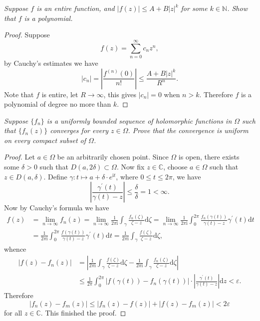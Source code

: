 \begin{problem}\em
Suppose $f$ is an entire function, and $|f(z)|\le A+B|z|^k$ for some $k\in\mathbb{N}$. Show that $f$ is a polynomial.
\end{problem}
\begin{proof}
Suppose 
$$f(z)=\sum_{n=0}^\infty c_nz^n,$$
by Cauchy's estimates we have 
$$
\left| c_n \right|=\left| \frac{f^{\left( n \right)}\left( 0 \right)}{n!} \right|\le \frac{A+B\left| z \right|^k}{R^n}.
$$
Note that $f$ is entire, let $R\to\infty$, this gives $|c_n|=0$ when $n>k$. Therefore $f$ is a polynomial of degree no more than $k$.
\end{proof}
\begin{problem}\em
Suppose $\{f_n\}$ is a uniformly bounded sequence of holomorphic functions in $\Omega$ such that $\{f_n(z)\}$ converges for every $z\in\Omega$. Prove that the convergence is uniform on every compact subset of $\Omega$.
\end{problem}
\begin{proof}
Let $a\in\Omega$ be an arbitrarily chosen point. Since $\Omega$ is open, there exists some $\delta>0$ such that $D(a,2\delta)\subset\Omega$. Now fix $z\in\mathbb{C}$, choose $a\in\Omega$ such that $z\in D(a,\delta)$. Define $\gamma:t\mapsto a+\delta\cdot e^{\mathrm{i}t}$, where $0\le t\le 2\pi$, we have 
$$
\left| \frac{\gamma ^{\prime}\left( t \right)}{\gamma \left( t \right) -z} \right|\le \frac{\delta}{\delta}=1<\infty .
$$
Now by Cauchy's formula we have 
$$
\begin{aligned}
f\left( z \right) &=\lim_{n\rightarrow \infty} f_n\left( z \right) =\lim_{n\rightarrow \infty} \frac{1}{2\pi \mathrm{i}}\int_{\gamma}{\frac{f_n\left( \zeta \right)}{\zeta -z}\mathrm{d}\zeta}=\lim_{n\rightarrow \infty} \frac{1}{2\pi \mathrm{i}}\int_0^{2\pi}{\frac{f_n\left( \gamma \left( t \right) \right)}{\gamma \left( t \right) -z}\gamma ^{\prime}\left( t \right) \mathrm{d}t}
\\
&=\frac{1}{2\pi \mathrm{i}}\int_0^{2\pi}{\frac{f\left( \gamma \left( t \right) \right)}{\gamma \left( t \right) -z}\gamma ^{\prime}\left( t \right) \mathrm{d}t}=\frac{1}{2\pi \mathrm{i}}\int_{\gamma}{\frac{f\left( \zeta \right)}{\zeta -z}\mathrm{d}\zeta},
\end{aligned}
$$
whence 
$$
\begin{aligned}
\left| f\left( z \right) -f_n\left( z \right) \right|&=\left| \frac{1}{2\pi \mathrm{i}}\int_{\gamma}{\frac{f\left( \zeta \right)}{\zeta -z}\mathrm{d}\zeta}-\frac{1}{2\pi \mathrm{i}}\int_{\gamma}{\frac{f_n\left( \zeta \right)}{\zeta -z}\mathrm{d}\zeta} \right|
\\
&\le \frac{1}{2\pi}\int_0^{2\pi}{\left| f\left( \gamma \left( t \right) \right) -f_n\left( \gamma \left( t \right) \right) \right|\cdot \left| \frac{\gamma ^{\prime}\left( t \right)}{\gamma \left( t \right) -z} \right|\mathrm{d}z}<\varepsilon .
\end{aligned}
$$
Therefore 
$$
\left| f_n\left( z \right) -f_m\left( z \right) \right|\le \left| f_n\left( z \right) -f\left( z \right) \right|+\left| f\left( z \right) -f_m\left( z \right) \right|<2\varepsilon 
$$
for all $z\in\mathbb{C}$. This finished the proof.
\end{proof}

